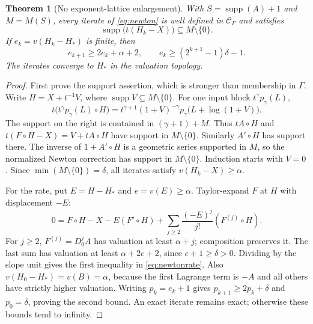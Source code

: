 \documentclass[11pt,a4paper]{article}
\newtheorem{theorem}{Theorem}[section]
\theoremstyle{definition}
\theoremstyle{remark}
\newcommand{\C}{\mathcal C_\Gamma}
\newcommand{\supp}{\operatorname{supp}}
\begin{document}
\begin{theorem}[No exponent-lattice enlargement]\label{thm:newton}
With $S=\supp(A)+1$ and $M=M(S)$, every iterate of \eqref{eq:newton} is
well defined in $\C$ and satisfies
\begin{equation}\label{eq:newtonsupp}
 \supp\bigl(t(H_k-X)\bigr)\subseteq M\setminus\{0\}.
\end{equation}
If $e_k=v(H_k-H_*)$ is finite, then
\begin{equation}\label{eq:newtonrate}
 e_{k+1}\ge 2e_k+\alpha+2,
 \qquad
 e_k\ge(2^{k+1}-1)\delta-1.
\end{equation}
The iterates converge to $H_*$ in the valuation topology.
\end{theorem}
\begin{proof}
First prove the support assertion, which is stronger than membership in
$\Gamma$. Write $H=X+t^{-1}V$, where $\supp V\subseteq M\setminus\{0\}$.
For one input block $t^\gamma p_\gamma(L)$,
\[
 t\bigl(t^\gamma p_\gamma(L)\circ H\bigr)
 =t^{\gamma+1}(1+V)^{-\gamma}
 p_\gamma\bigl(L+\log(1+V)\bigr).
\]
The support on the right is contained in $(\gamma+1)+M$.
Thus $tA\circ H$ and $t(F\circ H-X)=V+tA\circ H$ have support in
$M\setminus\{0\}$. Similarly $A'\circ H$ has support there. The inverse of
$1+A'\circ H$ is a geometric series supported in $M$, so the normalized
Newton correction has support in $M\setminus\{0\}$. Induction starts with
$V=0$. Since $\min(M\setminus\{0\})=\delta$, all iterates satisfy
$v(H_k-X)\ge\alpha$.

For the rate, put $E=H-H_*$ and $e=v(E)\ge\alpha$. Taylor-expand $F$ at
$H$ with displacement $-E$:
\[
 0=F\circ H-X-E(F'\circ H)
   +\sum_{j\ge2}\frac{(-E)^j}{j!}(F^{(j)}\circ H).
\]
For $j\ge2$, $F^{(j)}=D_0^jA$ has valuation at least $\alpha+j$;
composition preserves it. The last sum has valuation at least
$\alpha+2e+2$, since $e+1\ge\delta>0$. Dividing by the slope unit gives the
first inequality in \eqref{eq:newtonrate}. Also
$v(H_0-H_*)=v(B)=\alpha$, because the first Lagrange term is $-A$ and all
others have strictly higher valuation. Writing $p_k=e_k+1$ gives
$p_{k+1}\ge2p_k+\delta$ and $p_0=\delta$, proving the second bound.
An exact iterate remains exact; otherwise these bounds tend to infinity.
\end{proof}
\end{document}
